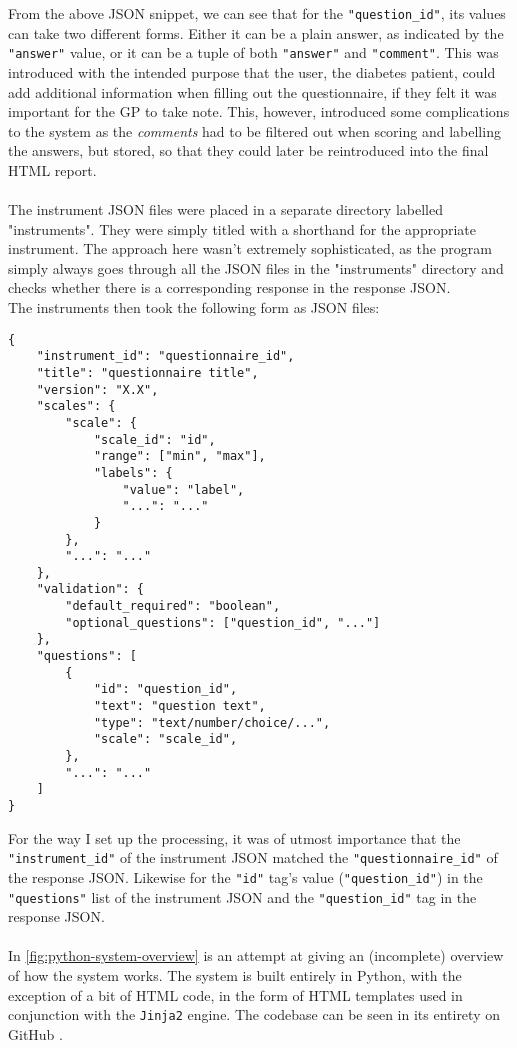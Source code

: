 \noindent
From the above JSON snippet, we can see that for the \texttt{"question_id"}, its values can take two different forms. Either it can be a plain answer, as indicated by the \texttt{"answer"} value, or it can be a tuple of both \texttt{"answer"} and \texttt{"comment"}. This was introduced with the intended purpose that the user, the diabetes patient, could add additional information when filling out the questionnaire, if they felt it was important for the GP to take note. This, however, introduced some complications to the system as the \emph{comments} had to be filtered out when scoring and labelling the answers, but stored, so that they could later be reintroduced into the final HTML report.
\\
\\
The instrument JSON files were placed in a separate directory labelled "instruments". They were simply titled with a shorthand for the appropriate instrument. The approach here wasn't extremely sophisticated, as the program simply always goes through all the JSON files in the "instruments" directory and checks whether there is a corresponding response in the response JSON.
\\
The instruments then took the following form as JSON files:
\begin{verbatim}
{
    "instrument_id": "questionnaire_id",
    "title": "questionnaire title",
    "version": "X.X",
    "scales": {
        "scale": {
            "scale_id": "id",
            "range": ["min", "max"],
            "labels": {
                "value": "label",
                "...": "..."
            }
        },
        "...": "..."
    },
    "validation": {
        "default_required": "boolean",
        "optional_questions": ["question_id", "..."]
    },
    "questions": [
        {
            "id": "question_id",
            "text": "question text",
            "type": "text/number/choice/...",
            "scale": "scale_id",
        },
        "...": "..."
    ]
}
\end{verbatim}

\noindent
For the way I set up the processing, it was of utmost importance that the \texttt{"instrument_id"} of the instrument JSON matched the \texttt{"questionnaire_id"} of the response JSON. Likewise for the \texttt{"id"} tag's value (\texttt{"question_id"}) in the \texttt{"questions"} list of the instrument JSON and the \texttt{"question_id"} tag in the response JSON.
\\
\\
In \autoref{fig:python-system-overview} is an attempt at giving an (incomplete) overview of how the system works. The system is built entirely in Python, with the exception of a bit of HTML code, in the form of HTML templates used in conjunction with the \texttt{Jinja2} engine. The codebase can be seen in its entirety on GitHub .

